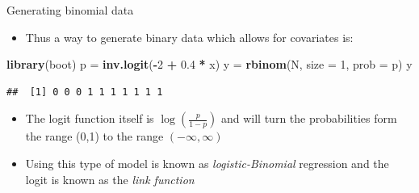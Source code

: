 \documentclass[ignorenonframetext,]{beamer}
\newenvironment{Shaded}{\begin{snugshade}}{\end{snugshade}}
\newcommand{\KeywordTok}[1]{\textcolor[rgb]{0.13,0.29,0.53}{\textbf{#1}}}
\newcommand{\DataTypeTok}[1]{\textcolor[rgb]{0.13,0.29,0.53}{#1}}
\newcommand{\DecValTok}[1]{\textcolor[rgb]{0.00,0.00,0.81}{#1}}
\newcommand{\FloatTok}[1]{\textcolor[rgb]{0.00,0.00,0.81}{#1}}
\newcommand{\StringTok}[1]{\textcolor[rgb]{0.31,0.60,0.02}{#1}}
\newcommand{\OperatorTok}[1]{\textcolor[rgb]{0.81,0.36,0.00}{\textbf{#1}}}
\newcommand{\NormalTok}[1]{#1}
\providecommand{\tightlist}{%
  \setlength{\itemsep}{0pt}\setlength{\parskip}{0pt}}
\begin{document}
\begin{frame}[fragile]{Generating binomial data}

\begin{itemize}
\tightlist
\item
  Thus a way to generate binary data which allows for covariates is:
\end{itemize}

\begin{Shaded}
\begin{Highlighting}[]
\KeywordTok{library}\NormalTok{(boot)}
\NormalTok{p =}\StringTok{ }\KeywordTok{inv.logit}\NormalTok{(}\OperatorTok{-}\DecValTok{2} \OperatorTok{+}\StringTok{ }\FloatTok{0.4} \OperatorTok{*}\StringTok{ }\NormalTok{x)}
\NormalTok{y =}\StringTok{ }\KeywordTok{rbinom}\NormalTok{(N, }\DataTypeTok{size =} \DecValTok{1}\NormalTok{, }\DataTypeTok{prob =}\NormalTok{ p)}
\NormalTok{y}
\end{Highlighting}
\end{Shaded}

\begin{verbatim}
##  [1] 0 0 0 1 1 1 1 1 1 1
\end{verbatim}

\begin{itemize}
\tightlist
\item
  The logit function itself is \(\log \left( \frac{p}{1-p} \right)\) and
  will turn the probabilities form the range (0,1) to the range
  \((-\infty,\infty)\)
\item
  Using this type of model is known as \emph{logistic-Binomial}
  regression and the logit is known as the \emph{link function}
\end{itemize}

\end{frame}
\end{document}

